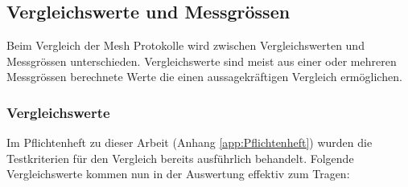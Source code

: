 %
%
%



\subsection{Vergleichswerte und Messgrössen}\label{subsec:VergleichswerteundMessgrössenMesh}
Beim Vergleich der Mesh Protokolle wird zwischen Vergleichswerten und Messgrössen unterschieden. Vergleichswerte sind meist aus einer oder mehreren Messgrössen berechnete Werte die einen aussagekräftigen Vergleich ermöglichen.

\subsubsection{Vergleichswerte}\label{subsubsec:Vergleichswerte}
Im Pflichtenheft zu dieser Arbeit (Anhang \ref{app:Pflichtenheft}) wurden die Testkriterien für den Vergleich bereits ausführlich behandelt.
Folgende Vergleichswerte kommen nun in der Auswertung effektiv zum Tragen:

